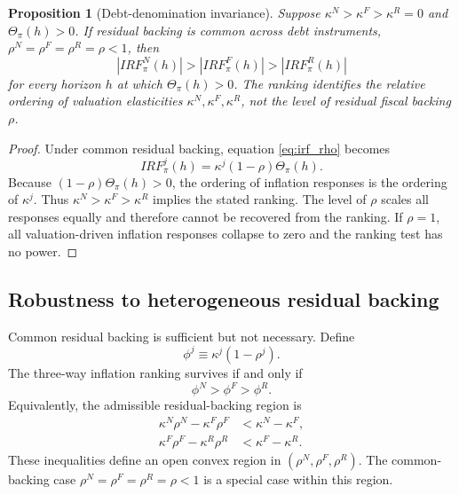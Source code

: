 \documentclass[12pt,a4paper]{article}
\newtheorem{proposition}{Proposition}
\begin{document}
\begin{proposition}[Debt-denomination invariance]
Suppose \(\kappa^N>\kappa^F>\kappa^R=0\) and \(\Theta_{\pi}(h)>0\). If residual backing is common across debt instruments, \(\rho^N=\rho^F=\rho^R=\rho<1\), then
\begin{equation}
|IRF_{\pi}^{N}(h)|>|IRF_{\pi}^{F}(h)|>|IRF_{\pi}^{R}(h)|
\end{equation}
for every horizon \(h\) at which \(\Theta_{\pi}(h)>0\). The ranking identifies the relative ordering of valuation elasticities \(\kappa^N,\kappa^F,\kappa^R\), not the level of residual fiscal backing \(\rho\).
\end{proposition}

\begin{proof}
Under common residual backing, equation \eqref{eq:irf_rho} becomes
\[
IRF_{\pi}^{j}(h)=\kappa^j(1-\rho)\Theta_{\pi}(h).
\]
Because \((1-\rho)\Theta_{\pi}(h)>0\), the ordering of inflation responses is the ordering of \(\kappa^j\). Thus \(\kappa^N>\kappa^F>\kappa^R\) implies the stated ranking. The level of \(\rho\) scales all responses equally and therefore cannot be recovered from the ranking. If \(\rho=1\), all valuation-driven inflation responses collapse to zero and the ranking test has no power.\end{proof}

\subsection{Robustness to heterogeneous residual backing}

Common residual backing is sufficient but not necessary. Define
\begin{equation}
\phi^j \equiv \kappa^j(1-\rho^j).
\end{equation}
The three-way inflation ranking survives if and only if
\begin{equation}
\phi^N>\phi^F>\phi^R.
\end{equation}
Equivalently, the admissible residual-backing region is
\begin{align}
\kappa^N\rho^N-\kappa^F\rho^F &< \kappa^N-\kappa^F,
\label{eq:region_nf}\\
\kappa^F\rho^F-\kappa^R\rho^R &< \kappa^F-\kappa^R.
\label{eq:region_fr}
\end{align}
These inequalities define an open convex region in \((\rho^N,\rho^F,\rho^R)\). The common-backing case \(\rho^N=\rho^F=\rho^R=\rho<1\) is a special case within this region.
\end{document}
